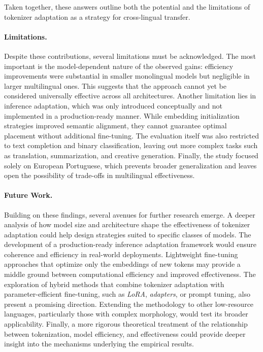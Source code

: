 Taken together, these answers outline both the potential and the limitations of tokenizer adaptation as a strategy for cross-lingual transfer.


\paragraph{\textbf{Limitations.}}
Despite these contributions, several limitations must be acknowledged. The most important is the model-dependent nature of the observed gains: efficiency improvements were substantial in smaller monolingual models but negligible in larger multilingual ones. This suggests that the approach cannot yet be considered universally effective across all architectures. Another limitation lies in inference adaptation, which was only introduced conceptually and not implemented in a production-ready manner. While embedding initialization strategies improved semantic alignment, they cannot guarantee optimal placement without additional fine-tuning. The evaluation itself was also restricted to text completion and binary classification, leaving out more complex tasks such as translation, summarization, and creative generation. Finally, the study focused solely on European Portuguese, which prevents broader generalization and leaves open the possibility of trade-offs in multilingual effectiveness.  


\paragraph{\textbf{Future Work.}}
Building on these findings, several avenues for further research emerge. A deeper analysis of how model size and architecture shape the effectiveness of tokenizer adaptation could help design strategies suited to specific classes of models. The development of a production-ready inference adaptation framework would ensure coherence and efficiency in real-world deployments. Lightweight fine-tuning approaches that optimize only the embeddings of new tokens may provide a middle ground between computational efficiency and improved effectiveness. The exploration of hybrid methods that combine tokenizer adaptation with parameter-efficient fine-tuning, such as \textit{LoRA}, \textit{adapters}, or prompt tuning, also present a promising direction. Extending the methodology to other low-resource languages, particularly those with complex morphology, would test its broader applicability. Finally, a more rigorous theoretical treatment of the relationship between tokenization, model efficiency, and effectiveness could provide deeper insight into the mechanisms underlying the empirical results.  

